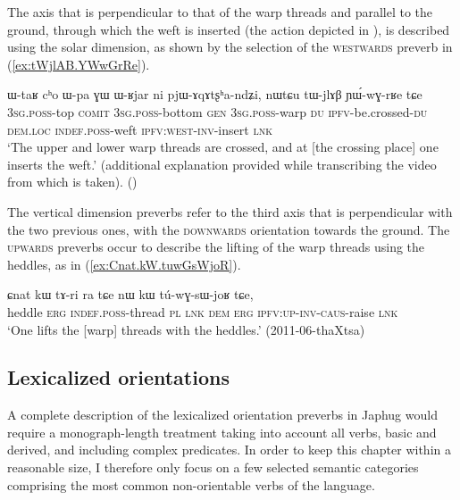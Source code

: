 The axis that is perpendicular to that of the warp threads and parallel to the ground, through which the weft is inserted (the action depicted in ), is described using the solar dimension, as shown by the selection of the \textsc{westwards} preverb in (\ref{ex:tWjlAB.YWwGrRe}).

\begin{exe}
\ex \label{ex:tWjlAB.YWwGrRe}
\gll ɯ-taʁ cʰo ɯ-pa ɣɯ ɯ-ʁjar ni pjɯ-ɤqɤtʂʰa-ndʑi, nɯtɕu tɯ-jlɤβ ɲɯ́-wɣ-rʁe tɕe   \\
\textsc{3sg}.\textsc{poss}-top \textsc{comit} \textsc{3sg}.\textsc{poss}-bottom \textsc{gen} \textsc{3sg}.\textsc{poss}-warp \textsc{du} \textsc{ipfv}-be.crossed-\textsc{du} \textsc{dem}.\textsc{loc} \textsc{indef}.\textsc{poss}-weft \textsc{ipfv}:\textsc{west}-\textsc{inv}-insert \textsc{lnk} \\
\glt `The upper and lower warp threads are crossed, and at [the crossing place] one inserts the weft.' (additional explanation provided while transcribing the video from which  is taken).%
()
\end{exe} 

The vertical dimension preverbs refer to the third axis that is perpendicular with the two previous ones, with the \textsc{downwards} orientation towards the ground. The \textsc{upwards} preverbs occur to describe the lifting of the warp threads using the heddles, as in (\ref{ex:Cnat.kW.tuwGsWjoR}).

\begin{exe}
\ex \label{ex:Cnat.kW.tuwGsWjoR}
\gll ɕnat kɯ tɤ-ri ra tɕe nɯ kɯ tú-wɣ-sɯ-joʁ tɕe,\\
heddle \textsc{erg} \textsc{indef}.\textsc{poss}-thread \textsc{pl} \textsc{lnk} \textsc{dem} \textsc{erg} \textsc{ipfv}:\textsc{up}-\textsc{inv}-\textsc{caus}-raise \textsc{lnk} \\
\glt `One lifts the [warp] threads with the heddles.' (2011-06-thaXtsa)
\end{exe}  

\subsection{Lexicalized orientations} \label{sec:lexicalized.orientation}
A complete description of the lexicalized orientation preverbs in Japhug would require a monograph-length treatment taking into account all verbs, basic and derived, and including complex predicates. In order to keep this chapter within a reasonable size, I therefore only focus on a few selected semantic categories comprising the most common non-orientable verbs of the language.


